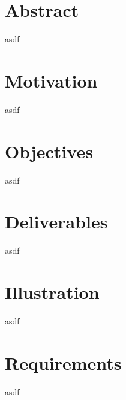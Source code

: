 \documentclass[12pt]{article}
\begin{document}
\tableofcontents
\pagebreak

\section{Abstract}
asdf

\section{Motivation}
asdf

\section{Objectives}
asdf

\section{Deliverables}
asdf

\section{Illustration}
asdf

\section{Requirements}
asdf
\end{document}
